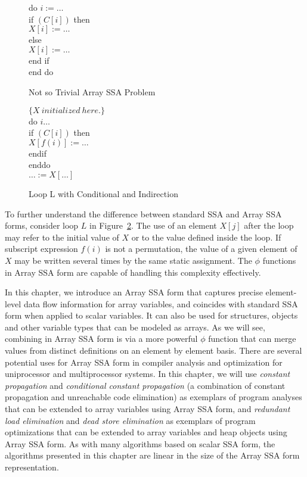 {\begin{figure}
\begin{programa}
\Ta do $i := \ldots$ \\
\Tb  if $(C[i])$ then \\
\Tc  $X[i] := \dots$  \\
\Tb  else \\
\Tc  $X[i] := \ldots$  \\
\Tb  end if \\
\Ta  end do 
\end{programa}
\caption{Not so Trivial Array SSA Problem}
\label{fig:array-ssa}
\end{figure}


\begin{figure}
\begin{programa}
\Ta  $\{X\ initialized\ here.\}$ \\
\Ta  do $i \ldots$ \\
\Tb  if $(C[i])$ then \\
\Tc $X[f(i)] := \ldots$ \\
\Tb  endif  \\
\Ta   enddo  \\
\Tb   $\ldots := X[\ldots]$  
\end{programa}
\caption{Loop L with Conditional and Indirection}
\label{cond-indirect}
\end{figure}

To further understand the difference between standard SSA and Array SSA
forms,
consider loop $L$
in Figure~\ref{cond-indirect}.  The
use of an element $X[j]$ after the loop
may refer to the initial value of $X$ or to the value
defined inside the loop. If subscript expression $f(i)$ is not a
permutation, the value of a given element of $X$ may be written
several times by the same static assignment.  
The $\phi$
functions in Array SSA form
 are capable of handling this complexity effectively.
}

In this chapter,
we introduce an Array SSA form 
that captures precise element-level data flow information for array variables, and
coincides with standard SSA form when applied to scalar variables.  
It can also be used for structures, objects and other variable types
that can be modeled as arrays.
As we will see, combining in Array SSA form
is via a more powerful $\phi$ function that can
merge values from distinct definitions on an element by element
basis. 
There are several potential uses for Array SSA form in compiler
analysis
and optimization for uniprocessor and multiprocessor systems.
In this chapter, we will use
{\it constant propagation} and
{\it conditional constant propagation} (a combination of
constant propagation and unreachable code elimination) 
as exemplars of program analyses that can be extended to array variables
using Array SSA form, and {\em redundant load elimination} and {\em dead store
elimination} as exemplars of program optimizations that can be extended to array variables and heap objects using Array SSA form.
As with many algorithms based on scalar SSA form, the algorithms presented in this chapter are linear in the size of the Array SSA form representation.

